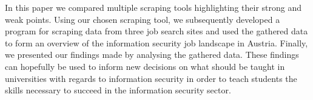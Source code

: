 \documentclass[runningheads]{llncs}
\begin{document}
In this paper we compared multiple scraping tools highlighting their strong and weak points. Using our chosen scraping tool, we subsequently developed a program for scraping data from three job search sites and used the gathered data to form an overview of the information security job landscape in Austria. Finally, we presented our findings made by analysing the gathered data. These findings can hopefully be used to inform new decisions on what should be taught in universities with regards to information security in order to teach students the skills necessary to succeed in the information security sector.

\newpage
\printbibliography
\end{document}
